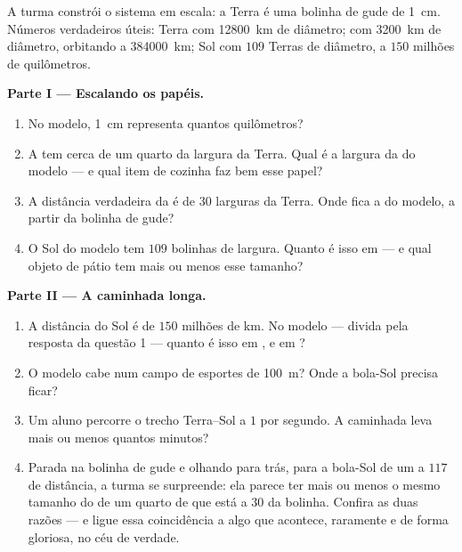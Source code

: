 \begin{problem}\label{pb:g6:sun-earth-moon:1}
A turma constrói o sistema em escala: a Terra é uma bolinha de gude
de \qty{1}{cm}. Números verdadeiros úteis: Terra com \qty{12800}{km}
de diâmetro;  com \qty{3200}{km} de diâmetro, orbitando a
\qty{384000}{km}; Sol com $109$ Terras de diâmetro, a $150$ milhões
de quilômetros.

\medskip\noindent\textbf{Parte I --- Escalando os papéis.}
\begin{enumerate}
  \item No modelo, \qty{1}{cm} representa quantos quilômetros?
  \item A  tem cerca de um quarto da largura da Terra. Qual é a
        largura da  do modelo --- e qual item de cozinha faz bem
        esse papel?
  \item A distância verdadeira da  é de $30$ larguras da Terra.
        Onde fica a  do modelo, a partir da bolinha de gude?
  \item O Sol do modelo tem $109$ bolinhas de largura. Quanto é isso
        em  --- e qual objeto de pátio tem mais ou menos
        esse tamanho?
\end{enumerate}

\medskip\noindent\textbf{Parte II --- A caminhada longa.}
\begin{enumerate}[resume]
  \item A distância do Sol é de $150$ milhões de km. No modelo ---
        divida pela resposta da questão 1 --- quanto é isso em
        , e em ?
  \item O modelo cabe num campo de esportes de \qty{100}{m}? Onde a
        bola-Sol precisa ficar?
  \item Um aluno percorre o trecho Terra--Sol a $1$  por
        segundo. A caminhada leva mais ou menos quantos minutos?
  \item Parada na bolinha de gude e olhando para trás, para a
        bola-Sol de um  a $117$  de distância, a turma se
        surpreende: ela parece ter mais ou menos o mesmo tamanho do
         de um quarto de  que está a $30$
         da bolinha. Confira as duas razões --- e ligue
        essa coincidência a algo que acontece, raramente e de forma
        gloriosa, no céu de verdade.
\end{enumerate}


\end{problem}
